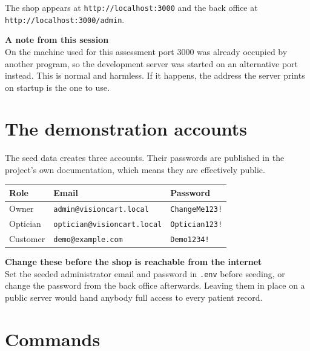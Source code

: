 \documentclass[11pt,a4paper]{report}
\newcommand{\code}[1]{\texttt{\small #1}}
\newcommand{\keybox}[2]{%
  \begin{center}
  \begin{minipage}{0.94\textwidth}
  \colorbox{vclight}{\parbox{\dimexpr\textwidth-2\fboxsep}{%
    \vspace{3pt}\textbf{\color{vcblue}#1}\\[3pt]#2\vspace{4pt}}}
  \end{minipage}
  \end{center}}
\begin{document}
The shop appears at \code{http://localhost:3000} and the back office at
\code{http://localhost:3000/admin}.

\keybox{A note from this session}{On the machine used for this assessment port
3000 was already occupied by another program, so the development server was
started on an alternative port instead. This is normal and harmless. If it
happens, the address the server prints on startup is the one to use.}

\section{The demonstration accounts}

The seed data creates three accounts. Their passwords are published in the
project's own documentation, which means they are effectively public.

\begin{center}
\begin{tabular}{@{}lll@{}}
\toprule
\textbf{Role} & \textbf{Email} & \textbf{Password}\\
\midrule
Owner & \code{admin@visioncart.local} & \code{ChangeMe123!}\\
Optician & \code{optician@visioncart.local} & \code{Optician123!}\\
Customer & \code{demo@example.com} & \code{Demo1234!}\\
\bottomrule
\end{tabular}
\end{center}

\keybox{Change these before the shop is reachable from the internet}{Set the
seeded administrator email and password in \code{.env} before seeding, or
change the password from the back office afterwards. Leaving them in place on
a public server would hand anybody full access to every patient record.}

\section{Commands}
\end{document}
